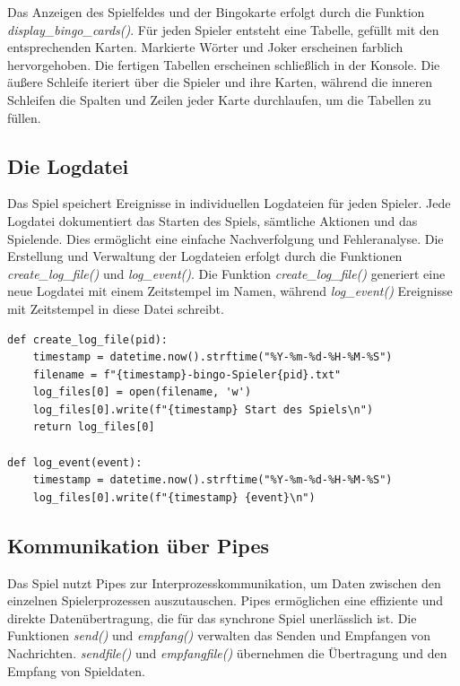 \documentclass{llncs}
\begin{document}
Das Anzeigen des Spielfeldes und der Bingokarte erfolgt durch die Funktion \textit{display\_bingo\_cards()}. Für jeden Spieler entsteht eine Tabelle, gefüllt mit den entsprechenden Karten. Markierte Wörter und Joker erscheinen farblich hervorgehoben. Die fertigen Tabellen erscheinen schließlich in der Konsole. Die äußere Schleife iteriert über die Spieler und ihre Karten, während die inneren Schleifen die Spalten und Zeilen jeder Karte durchlaufen, um die Tabellen zu füllen.

\subsection{Die Logdatei}

Das Spiel speichert Ereignisse in individuellen Logdateien für jeden Spieler. Jede Logdatei dokumentiert das Starten des Spiels, sämtliche Aktionen und das Spielende. Dies ermöglicht eine einfache Nachverfolgung und Fehleranalyse. Die Erstellung und Verwaltung der Logdateien erfolgt durch die Funktionen \textit{create\_log\_file()} und \textit{log\_event()}. Die Funktion \textit{create\_log\_file()} generiert eine neue Logdatei mit einem Zeitstempel im Namen, während \textit{log\_event()} Ereignisse mit Zeitstempel in diese Datei schreibt.

\begin{lstlisting}[caption=Erstellung und Verwaltung der Logdatei]
def create_log_file(pid):
    timestamp = datetime.now().strftime("%Y-%m-%d-%H-%M-%S")
    filename = f"{timestamp}-bingo-Spieler{pid}.txt"
    log_files[0] = open(filename, 'w')
    log_files[0].write(f"{timestamp} Start des Spiels\n")
    return log_files[0]

def log_event(event):
    timestamp = datetime.now().strftime("%Y-%m-%d-%H-%M-%S")
    log_files[0].write(f"{timestamp} {event}\n")
\end{lstlisting}

\subsection{Kommunikation über Pipes}

Das Spiel nutzt Pipes zur Interprozesskommunikation, um Daten zwischen den einzelnen Spielerprozessen auszutauschen. Pipes ermöglichen eine effiziente und direkte Datenübertragung, die für das synchrone Spiel unerlässlich ist. Die Funktionen \textit{send()} und \textit{empfang()} verwalten das Senden und Empfangen von Nachrichten. \textit{sendfile()} und \textit{empfangfile()} übernehmen die Übertragung und den Empfang von Spieldaten.
\end{document}
